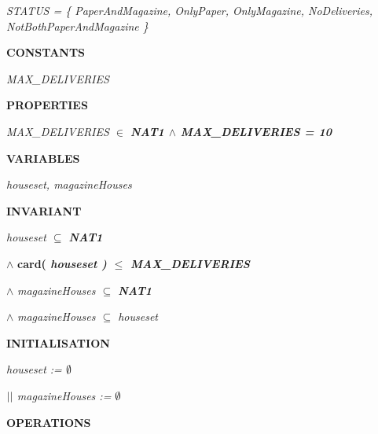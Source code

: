 \documentclass[11pt]{article}
\begin{document}
\begin{sloppypar}
\hspace*{0.40in}\it STATUS \rm = \rm \{ \it PaperAndMagazine\rm , \it OnlyPaper\rm , \it OnlyMagazine\rm , \it NoDeliveries\rm , \it NotBothPaperAndMagazine \rm \}

\vspace*{4mm}
\hspace*{0.20in}\bf CONSTANTS

\hspace*{0.40in}\it MAX\_DELIVERIES\hspace*{0.30in}

\hspace*{0.20in}\bf PROPERTIES

\hspace*{0.40in}\it MAX\_DELIVERIES  $\in$  \bf NAT1\hspace*{0.10in} $\land$ \hspace*{0.10in}\it MAX\_DELIVERIES \rm = \rm 1\rm 0

\hspace*{0.10in}

\hspace*{0.20in}\bf VARIABLES

\hspace*{0.40in}\it houseset\rm , \it magazineHouses

\hspace*{0.20in}\bf INVARIANT

\hspace*{0.40in}\it houseset  $\subseteq$  \bf NAT1 

\hspace*{0.40in} $\land$  \bf card\rm ( \it houseset \rm )  $\leq$  \it MAX\_DELIVERIES 

\hspace*{0.40in} $\land$  \it magazineHouses  $\subseteq$  \bf NAT1 

\hspace*{0.40in} $\land$  \it magazineHouses  $\subseteq$  \it houseset

\vspace*{4mm}
\hspace*{0.20in}\bf INITIALISATION

\hspace*{0.40in}\it houseset \rm :=  $\emptyset$ 

\hspace*{0.40in} $\mbox{$\mid\mid$}$  \it magazineHouses \rm :=  $\emptyset$ 

\vspace*{4mm}
\hspace*{0.20in}\bf OPERATIONS


\end{sloppypar}
\end{document}
